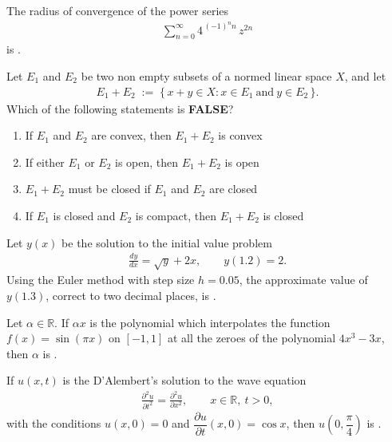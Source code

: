 \documentclass[journal,12pt,onecolumn]{IEEEtran}
\theoremstyle{remark}
\begin{document}
\begin{enumerate}
{\item The radius of convergence of the power series
\begin{align*}
\sum_{n=0}^{\infty} 4^{\,(-1)^{n} n}\, z^{2n}
\end{align*}
is \underline{\hspace{2.5cm}}.

\hfill{}

\item Let $E_1$ and $E_2$ be two non empty subsets of a normed linear space $X$, and let
\begin{align*}
E_{1}+E_{2}\;:=\;\{\,x+y\in X : x\in E_{1}\ \text{and}\ y\in E_{2}\,\}.
\end{align*}
Which of the following statements is \textbf{FALSE}?

\hfill{}

\begin{enumerate}
\item If $E_1$ and $E_2$ are convex, then $E_1+E_2$ is convex
\item If either $E_1$ or $E_2$ is open, then $E_1+E_2$ is open
\item $E_1+E_2$ must be closed if $E_1$ and $E_2$ are closed
\item If $E_1$ is closed and $E_2$ is compact, then $E_1+E_2$ is closed
\end{enumerate}


\item Let $y(x)$ be the solution to the initial value problem
\begin{align*}
\frac{dy}{dx}=\sqrt{y}+2x, \qquad y(1.2)=2.
\end{align*}
Using the Euler method with step size $h=0.05$, the approximate value of $y(1.3)$,
correct to two decimal places, is \underline{\hspace{3cm}}.

\hfill{}

\item Let $\alpha\in\mathbb{R}$. If $\alpha x$ is the polynomial which
interpolates the function $f(x)=\sin(\pi x)$ on $[-1,1]$ at all the zeroes
of the polynomial $4x^{3}-3x$, then $\alpha$ is
\underline{\hspace{2.0cm}}.

\hfill{}

\item If $u(x,t)$ is the D'Alembert's solution to the wave equation
\begin{align*}
\frac{\partial^{2}u}{\partial t^{2}}=\frac{\partial^{2}u}{\partial x^{2}},
\qquad x\in\mathbb{R},\ t>0,
\end{align*}
with the conditions $u(x,0)=0$ and $\dfrac{\partial u}{\partial t}(x,0)=\cos x$,
then $u\!\left(0,\dfrac{\pi}{4}\right)$ is \underline{\hspace{2.2cm}}.

}
\end{enumerate}
\end{document}
